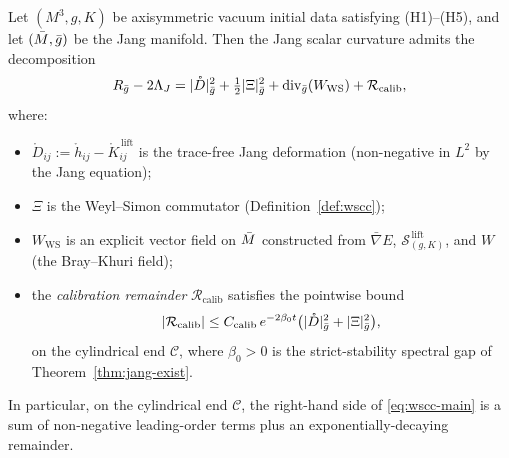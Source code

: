 \begin{theorem}\label{thm:wscc-main}
Let $(M^3, g, K)$ be axisymmetric vacuum initial data satisfying (H1)--(H5), and let $(\bar{M}, \bar{g})$ be the Jang manifold. Then the Jang scalar curvature admits the decomposition
\begin{equation}\label{eq:wscc-main}
R_{\bar{g}} - 2\Lambda_J = |\mathring{D}|^2_{\bar{g}} + \tfrac{1}{2}|\Xi|^2_{\bar{g}} + \mathrm{div}_{\bar{g}}(W_{\mathrm{WS}}) + \mathcal{R}_{\mathrm{calib}},
\end{equation}
where:
\begin{itemize}
\item $\mathring{D}_{ij} := \mathring{h}_{ij} - \mathring{K}_{ij}^{\,\mathrm{lift}}$ is the trace-free Jang deformation (non-negative in $L^2$ by the Jang equation);
\item $\Xi$ is the Weyl--Simon commutator (Definition~\ref{def:wscc});
\item $W_{\mathrm{WS}}$ is an explicit vector field on $\bar{M}$ constructed from $\bar\nabla E$, $\mathcal{S}_{(g,K)}^{\,\mathrm{lift}}$, and $W$ (the Bray--Khuri field);
\item the \emph{calibration remainder} $\mathcal{R}_{\mathrm{calib}}$ satisfies the pointwise bound
\begin{equation}\label{eq:calib-remainder-bound}
|\mathcal{R}_{\mathrm{calib}}| \leq C_{\mathrm{calib}}\,e^{-2\beta_0 t}\bigl(|\mathring{D}|^2_{\bar{g}} + |\Xi|^2_{\bar{g}}\bigr),
\end{equation}
on the cylindrical end $\mathcal{C}$, where $\beta_0>0$ is the strict-stability spectral gap of Theorem~\ref{thm:jang-exist}.
\end{itemize}
In particular, on the cylindrical end $\mathcal{C}$, the right-hand side of \eqref{eq:wscc-main} is a sum of non-negative leading-order terms plus an exponentially-decaying remainder.
\end{theorem}

